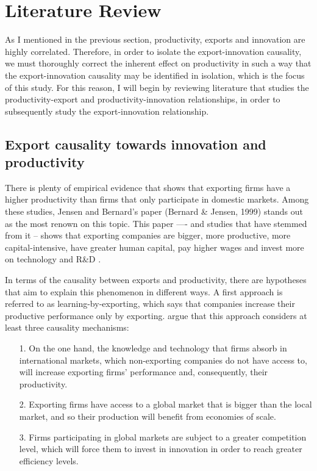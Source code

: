 \section{Literature Review}
As I mentioned in the previous section, productivity, exports and innovation are highly correlated. Therefore, in order to isolate the export-innovation causality, we must thoroughly correct the inherent effect on productivity in such a way that the export-innovation causality may be identified in isolation, which is the focus of this study. For this reason, I will begin by reviewing literature that studies the productivity-export and productivity-innovation relationships, in order to subsequently study the export-innovation relationship.

\subsection{Export causality towards innovation and productivity}
There is plenty of empirical evidence that shows that exporting firms have a higher productivity than firms that only participate in domestic markets. Among these studies, Jensen and Bernard's paper (Bernard \& Jensen, 1999) stands out as the most renown on this topic. This paper —- and studies that have stemmed from it -- shows that exporting companies are bigger, more productive, more capital-intensive, have greater human capital, pay higher wages and invest more on technology and R\&D \citep{BenaventeBravoGonzalez2014}.

In terms of the causality between exports and productivity, there are hypotheses that aim to explain this phenomenon in different ways. A first approach is referred to as learning-by-exporting, which says that companies increase their productive performance only by exporting. \cite{GreenawayKneller2007} argue that this approach considers at least three causality mechanisms:

\begin{itemize}
\item[1.] On the one hand, the knowledge and technology that firms absorb in international markets, which non-exporting companies do not have access to, will increase exporting firms' performance and, consequently, their productivity.
\item[2.] Exporting firms have access to a global market that is bigger than the local market, and so their production will benefit from economies of scale.
\item[3.] Firms participating in global markets are subject to a greater competition level, which will force them to invest in innovation in order to reach greater efficiency levels.
\end{itemize}

